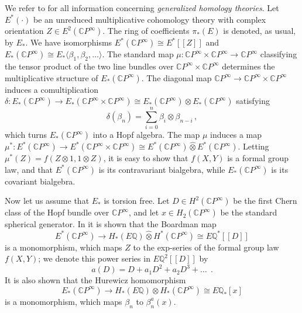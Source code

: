 \documentclass[a4paper,12pt]{amsart}
\theoremstyle{definition}
\numberwithin{equation}{section}
\newcommand{\bC}{{\mathbb C}}
\newcommand{\bQ}{{\mathbb Q}}
\newcommand{\CP}{\bC P^\infty}
\newcommand{\EuC}{E^*(\CP)}
\newcommand{\ElC}{E_*(\CP)}
\newcommand{\EQ}{E\bQ}
\begin{document}
We refer to \cite{adashg} for all information concerning {\em generalized homology theories}. Let $E^*(\cdot)$ be an unreduced multiplicative cohomology theory
with complex orientation $Z\in E^2(\CP)$. The ring of coefficients
$\pi_*(E)$ is denoted, as usual, by $E_*$. We have isomorphisms $E^*(\CP)\cong E^*[[Z]]$ and $E_*(\CP)\cong E_*\langle\beta_1,\beta_2,\ldots\rangle$. The standard map
$\mu\colon\bC P^\infty\times\bC P^\infty\rightarrow\bC P^\infty$
classifying the tensor product of the two line bundles over $\bC
P^\infty\times\bC P^\infty$ determines the multiplicative structure of
$\ElC$. The diagonal map $\CP\rightarrow\CP\times\CP$ induces a comultiplication $\delta\colon E_*(\CP)\rightarrow E_*(\CP\times\CP)\cong E_*(\CP)\otimes E_*(\CP)$ satisfying
\[\delta(\beta_n)=\sum_{i=0}^n\beta_i\otimes\beta_{n-i}\,,\]
which turns $E_*(\CP)$ into a Hopf algebra. The map $\mu$ induces a map $\mu^*\colon\EuC\rightarrow E^*(\CP\times\CP)\cong\EuC\widehat{\otimes}\EuC$. Letting $\mu^*(Z)=f(Z\otimes 1,1\otimes Z)$, it is easy to show that $f(X,Y)$ is a formal group law, and that $\EuC$ is its contravariant bialgebra, while $\ElC$ is its covariant bialgebra. 

Now let us assume that $E_*$ is torsion free. Let $D\in H^2(\CP)$ be the first Chern class of the Hopf bundle over $\CP$, and let $x\in H_2(\CP)$ be the standard spherical generator. In \cite{rayscn} it is shown that the Boardman map 
\[ \EuC\rightarrow H_*(\EQ)\widehat{\otimes}H^*(\CP)\cong \EQ^*[[D]]\]
is a monomorphism, which maps $Z$ to the exp-series of the formal group law $f(X,Y)$; we denote this power series in $\EQ^2[[D]]$ by
\[ a(D)=D+a_1D^2+a_2 D^3+\ldots\;\,.\]
It is also shown that the Hurewicz homomorphism 
\[ \ElC\rightarrow H_*(\EQ)\otimes H_*(\CP)\cong\EQ_*[x]\]
is a monomorphism, which maps $\beta_n$ to $\beta_n^a(x)$.
\end{document}
